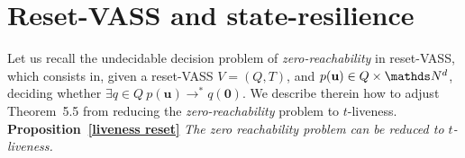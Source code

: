 

\section{Reset-VASS and state-resilience}\label{appendix}







Let us recall the undecidable \cite{araki1976PN} decision problem of {\em zero-reachability} in reset-VASS, which consists in, given a
reset-VASS $V=(Q,T)$, and $p(\textbf{u}) \in Q \times \N^d$,
deciding whether $\exists q \in Q ~ p(\textbf{u}) \to^* q(\textbf{0})$.
We describe therein how to adjust Theorem~5.5 from \cite{peterson1981petri} reducing the {\em zero-reachability} problem to {\sc $t$-liveness}. \\

\noindent
\textbf{Proposition~\ref{liveness reset}}
{\em The  zero reachability problem can be reduced to {\sc $t$-liveness}.}



